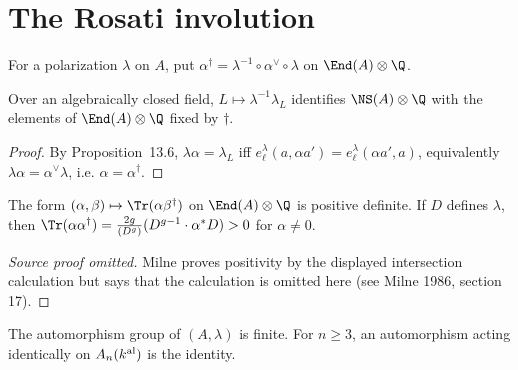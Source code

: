 \section{The Rosati involution}
\begin{definition}\label{def:milne-rosati-involution}
For a polarization $\lambda$ on $A$, put $\alpha^\dagger=\lambda^{-1}\circ\alpha^\vee\circ\lambda$ on $\End(A)\otimes\Q$.
\end{definition}
\begin{proposition}\label{prop:milne-rosati-ns}
Over an algebraically closed field, $L\mapsto\lambda^{-1}\lambda_L$ identifies $\NS(A)\otimes\Q$ with the elements of $\End(A)\otimes\Q$ fixed by $\dagger$.
\end{proposition}

\begin{proof}

By Proposition~13.6, $\lambda\alpha=\lambda_L$ iff $e_\ell^\lambda(a,\alpha a')=e_\ell^\lambda(\alpha a',a)$, equivalently $\lambda\alpha=\alpha^\vee\lambda$, i.e. $\alpha=\alpha^\dagger$.

\end{proof}

\begin{theorem}\label{thm:milne-rosati-positivity}
The form $(\alpha,\beta)\mapsto\Tr(\alpha\beta^\dagger)$ on $\End(A)\otimes\Q$ is positive definite. If $D$ defines $\lambda$, then $\Tr(\alpha\alpha^\dagger)=\frac{2g}{(D^g)}(D^{g-1}\cdot\alpha^*D)>0$ for $\alpha\ne0$.
\end{theorem}
\begin{proof}[Source proof omitted]
Milne proves positivity by the displayed intersection calculation but says that
the calculation is omitted here (see Milne 1986, section 17).
\end{proof}
\begin{proposition}\label{prop:milne-rosati-automorphisms}
The automorphism group of $(A,\lambda)$ is finite. For $n\ge3$, an automorphism acting identically on $A_n(k^{\rm al})$ is the identity.
\end{proposition}


